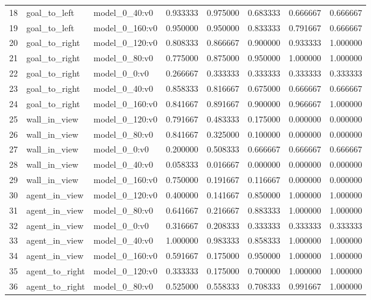 \begin{tabular}{lllrrrrr}
18 & goal\_to\_left & model\_0\_40:v0 & 0.933333 & 0.975000 & 0.683333 & 0.666667 & 0.666667 \\
19 & goal\_to\_left & model\_0\_160:v0 & 0.950000 & 0.950000 & 0.833333 & 0.791667 & 0.666667 \\
20 & goal\_to\_right & model\_0\_120:v0 & 0.808333 & 0.866667 & 0.900000 & 0.933333 & 1.000000 \\
21 & goal\_to\_right & model\_0\_80:v0 & 0.775000 & 0.875000 & 0.950000 & 1.000000 & 1.000000 \\
22 & goal\_to\_right & model\_0\_0:v0 & 0.266667 & 0.333333 & 0.333333 & 0.333333 & 0.333333 \\
23 & goal\_to\_right & model\_0\_40:v0 & 0.858333 & 0.816667 & 0.675000 & 0.666667 & 0.666667 \\
24 & goal\_to\_right & model\_0\_160:v0 & 0.841667 & 0.891667 & 0.900000 & 0.966667 & 1.000000 \\
25 & wall\_in\_view & model\_0\_120:v0 & 0.791667 & 0.483333 & 0.175000 & 0.000000 & 0.000000 \\
26 & wall\_in\_view & model\_0\_80:v0 & 0.841667 & 0.325000 & 0.100000 & 0.000000 & 0.000000 \\
27 & wall\_in\_view & model\_0\_0:v0 & 0.200000 & 0.508333 & 0.666667 & 0.666667 & 0.666667 \\
28 & wall\_in\_view & model\_0\_40:v0 & 0.058333 & 0.016667 & 0.000000 & 0.000000 & 0.000000 \\
29 & wall\_in\_view & model\_0\_160:v0 & 0.750000 & 0.191667 & 0.116667 & 0.000000 & 0.000000 \\
30 & agent\_in\_view & model\_0\_120:v0 & 0.400000 & 0.141667 & 0.850000 & 1.000000 & 1.000000 \\
31 & agent\_in\_view & model\_0\_80:v0 & 0.641667 & 0.216667 & 0.883333 & 1.000000 & 1.000000 \\
32 & agent\_in\_view & model\_0\_0:v0 & 0.316667 & 0.208333 & 0.333333 & 0.333333 & 0.333333 \\
33 & agent\_in\_view & model\_0\_40:v0 & 1.000000 & 0.983333 & 0.858333 & 1.000000 & 1.000000 \\
34 & agent\_in\_view & model\_0\_160:v0 & 0.591667 & 0.175000 & 0.950000 & 1.000000 & 1.000000 \\
35 & agent\_to\_right & model\_0\_120:v0 & 0.333333 & 0.175000 & 0.700000 & 1.000000 & 1.000000 \\
36 & agent\_to\_right & model\_0\_80:v0 & 0.525000 & 0.558333 & 0.708333 & 0.991667 & 1.000000 \\

\end{tabular}
